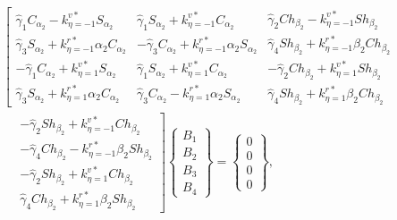 \documentclass[preprint,12pt]{elsarticle}
\begin{document}
\begin{equation}\label{eq:ABy}
	\begin{split}
		&\left[ \begin{array}{c}
			\hat{\gamma}_1C_{\alpha_2}-k^{v*}_{\eta=-1}S_{\alpha_2} \\ \hat{\gamma}_3S_{\alpha_2}+k^{r*}_{\eta=-1}\alpha_2C_{\alpha_2} \\ -\hat{\gamma}_1C_{\alpha_2}+k^{v*}_{\eta=1}S_{\alpha_2} \\ \hat{\gamma}_3S_{\alpha_2}+k^{r*}_{\eta=1}\alpha_2C_{\alpha_2}
		\end{array} \begin{array}{c}
			\hat{\gamma}_1S_{\alpha_2}+k^{v*}_{\eta=-1}C_{\alpha_2} \\ -\hat{\gamma}_3C_{\alpha_2}+k^{r*}_{\eta=-1}\alpha_2S_{\alpha_2} \\ \hat{\gamma}_1S_{\alpha_2}+k^{v*}_{\eta=1}C_{\alpha_2} \\ \hat{\gamma}_3C_{\alpha_2}-k^{r*}_{\eta=1}\alpha_2S_{\alpha_2}
		\end{array} \begin{array}{c}
			\hat{\gamma}_2Ch_{\beta_2}-k^{v*}_{\eta=-1}Sh_{\beta_2} \\ \hat{\gamma}_4Sh_{\beta_2}+k^{r*}_{\eta=-1}\beta_2Ch_{\beta_2} \\ -\hat{\gamma}_2Ch_{\beta_2}+k^{v*}_{\eta=1}Sh_{\beta_2} \\ \hat{\gamma}_4Sh_{\beta_2}+k^{r*}_{\eta=1}\beta_2Ch_{\beta_2}
		\end{array} \right. \\
		&\quad
		\left. \begin{array}{c}
			-\hat{\gamma}_2Sh_{\beta_2}+k^{v*}_{\eta=-1}Ch_{\beta_2} \\ -\hat{\gamma}_4Ch_{\beta_2}-k^{r*}_{\eta=-1}\beta_2Sh_{\beta_2} \\ -\hat{\gamma}_2Sh_{\beta_2}+k^{v*}_{\eta=1}Ch_{\beta_2} \\ \hat{\gamma}_4Ch_{\beta_2}+k^{r*}_{\eta=1}\beta_2Sh_{\beta_2}
		\end{array} \right]\begin{Bmatrix}
			B_1\\B_2\\B_3\\B_4
		\end{Bmatrix}=\begin{Bmatrix}
			0\\0\\0\\0
		\end{Bmatrix},
	\end{split}
\end{equation}
\end{document}

